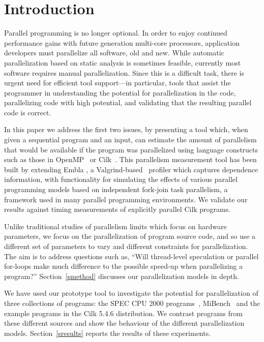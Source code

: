 \section{Introduction}

Parallel programming is no longer optional.  In order to enjoy continued
performance gains with future generation multi-core processors,
application developers must parallelize all software, old and
new.
While automatic parallelization based on static analysis 
is sometimes feasible, currently most software requires manual
parallelization.
Since this is a difficult task, there is urgent need for efficient tool support---in
particular, tools that assist the programmer in understanding the potential 
for parallelization in the code, parallelizing code with high potential, 
and validating that the resulting parallel code is correct.

In this paper we address the first two issues, by presenting a tool
which, when given a sequential program and an input, can estimate the 
amount of parallelism that would be available if the program was parallelized
using language constructs such as those in OpenMP~\cite{dagum98openmp}
or Cilk~\cite{blumofe96cilk}.
This parallelism measurement tool has been built by extending
Embla \cite{embla:08}, a Valgrind-based~\cite{valgrind:07} profiler which captures dependence information,
with functionality for simulating the effects of various parallel 
programming models based on independent fork-join task parallelism,
a framework used in many parallel programming environments.
We validate our results against timing 
measurements of explicitly parallel Cilk programs.

Unlike traditional studies of parallelism limits \cite{wall91limits,warg01limits}
which focus on hardware parameters, we focus on the 
parallelization of program source code, and so use a
different set of parameters to vary and different constraints for
parallelization. The aim is to address questions such as,
``Will thread-level speculation or parallel for-loops make much
difference to the possible speed-up when parallelizing
a program?'' Section~\ref{smethod} 
discusses our parallelization models in depth.

We have used our prototype tool to investigate the potential for 
parallelization of three collections of programs: the SPEC CPU 2000 
programs~\cite{henning00spec}, MiBench~\cite{guthaus01mibench} and the example programs in
the Cilk 5.4.6 distribution.
We contrast programs from these different sources and show the behaviour of 
the different parallelization models.
Section~\ref{sresults} reports the results of these experiments.

